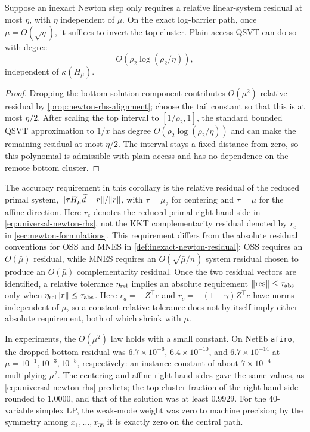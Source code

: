 \begin{corollary}
\label{cor:top-window-solve}
Suppose an inexact Newton step only requires a relative linear-system
residual at most $\eta$, with $\eta$ independent of $\mu$.  On the exact
log-barrier path, once $\mu=O(\sqrt\eta)$, it suffices to invert the top
cluster.  Plain-access QSVT can do so with degree
\begin{equation}
 O\!\left(\rho_2\log(\rho_2/\eta)\right),
 \label{eq:top-window-qsvt-degree}
\end{equation}
independent of $\kappa(H_\mu)$.
\end{corollary}

\begin{proof}
Dropping the bottom solution component contributes $O(\mu^2)$ relative
residual by \cref{prop:newton-rhs-alignment}; choose the tail constant so
that this is at most $\eta/2$.  After scaling the top interval to
$[1/\rho_2,1]$, the standard bounded QSVT approximation to $1/x$ has degree
$O(\rho_2\log(\rho_2/\eta))$ and can make the remaining residual at most
$\eta/2$.  The interval stays a fixed distance from zero, so this polynomial
is admissible with plain access and has no dependence on the remote bottom
cluster.
\end{proof}

The accuracy requirement in this corollary is the relative residual of the
reduced primal system,
$\lVert\tau H_\mu\widetilde d-r\rVert/\lVert r\rVert$, with $\tau=\mu_2$ for centering
and $\tau=\mu$ for the affine direction.  Here $r_c$ denotes the reduced
primal right-hand side in \eqref{eq:universal-newton-rhs}, not the KKT
complementarity residual denoted by $r_c$ in \cref{sec:newton-formulations}.
This requirement differs from the absolute residual conventions for OSS and
MNES in \cref{def:inexact-newton-residual}: OSS requires
an $O(\bar\mu)$ residual, while MNES requires an
$O(\sqrt{\bar\mu/n})$ system residual chosen to produce an
$O(\bar\mu)$ complementarity residual.  Once the two residual vectors are
identified, a relative tolerance $\eta_{\rm rel}$ implies an absolute requirement
$\lVert\mathrm{res}\rVert\leq\tau_{\rm abs}$ only when
$\eta_{\rm rel}\lVert r\rVert\leq\tau_{\rm abs}$.  Here $r_a=-Z^\top c$ and
$r_c=-(1-\gamma)Z^\top c$ have norms independent of $\mu$, so a constant
relative tolerance does not by itself imply either absolute requirement,
both of which shrink with $\bar\mu$.

In experiments, the $O(\mu^2)$ law holds with a small constant.  On
Netlib \texttt{afiro}, the dropped-bottom residual was
$6.7\times10^{-6}$, $6.4\times10^{-10}$, and $6.7\times10^{-14}$ at
$\mu=10^{-1},10^{-3},10^{-5}$, respectively: an instance constant of about
$7\times10^{-4}$ multiplying $\mu^2$.  The centering and affine right-hand
sides gave the same values, as \eqref{eq:universal-newton-rhs} predicts; the
top-cluster fraction of the right-hand side rounded to $1.0000$, and that of
the solution was at least $0.9929$.  For the 40-variable simplex LP,
the weak-mode weight was zero to machine precision; by the symmetry among
$x_1,\dots,x_{38}$ it is exactly zero on the central path.

